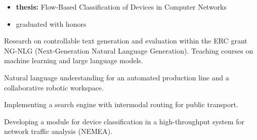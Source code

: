 \documentclass[10pt,a4paper,ragged2e]{altacv}
\begin{document}
\begin{itemize}
\item \textbf{thesis:} Flow-Based Classification of Devices in Computer Networks
\item graduated with honors
\end{itemize}



\small Research on controllable text generation and evaluation within the ERC grant NG-NLG (Next-Generation Natural Language Generation). Teaching courses on machine learning and large language models.

\divider

\small Natural language understanding for an automated production line and a collaborative robotic workspace.

\divider

\small Implementing a search engine with intermodal routing for public transport.

\divider

\small Developing a module for device classification in a high-throughput system for network traffic analysis (NEMEA).




\clearpage
{}
\nocite{*}

  






\end{document}
